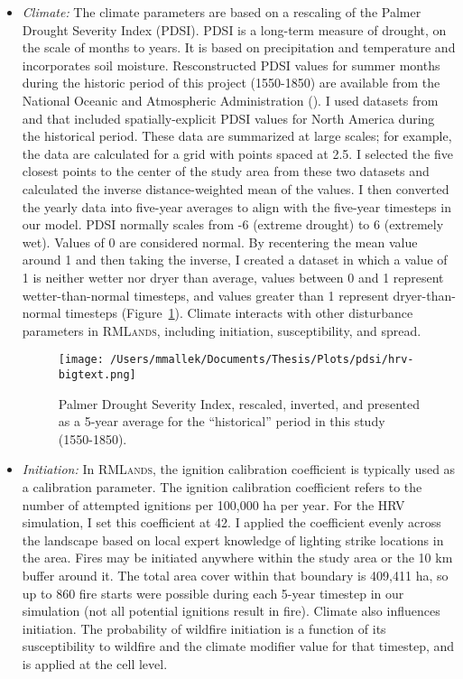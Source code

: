 \begin{itemize}
\item \emph{Climate:} The climate parameters are based on a rescaling of the Palmer Drought Severity Index (PDSI). PDSI is a long-term measure of drought, on the scale of months to years. It is based on precipitation and temperature and incorporates soil moisture. Resconstructed PDSI values for summer months during the historic period of this project (1550-1850) are available from the National Oceanic and Atmospheric Administration (). I used datasets from \citet{Zhangetal.2004} and \citet{Cook2004} that included spatially-explicit PDSI values for North America during the historical period. These data are summarized at large scales; for example, the \citet{Cook2004} data are calculated for a grid with points spaced at 2.5\textdegree. I selected the five closest points to the center of the study area from these two datasets and calculated the inverse distance-weighted mean of the values. I then converted the yearly data into five-year averages to align with the five-year timesteps in our model. PDSI normally scales from -6 (extreme drought) to 6 (extremely wet). Values of 0 are considered normal. By recentering the mean value around 1 and then taking the inverse, I created a dataset in which a value of 1 is neither wetter nor dryer than average, values between 0 and 1 represent wetter-than-normal timesteps, and values greater than 1 represent dryer-than-normal timesteps (Figure~\ref{pdsi}). Climate interacts with other disturbance parameters in \textsc{RMLands}, including initiation, susceptibility, and spread.

\begin{figure}[htbp]
\centering
\texttt{[image: /Users/mmallek/Documents/Thesis/Plots/pdsi/hrv-bigtext.png]}
\caption{Palmer Drought Severity Index, rescaled, inverted, and presented as a 5-year average for the ``historical'' period in this study (1550-1850).} 
\label{pdsi}
\end{figure}


\item \emph{Initiation:} In \textsc{RMLands}, the ignition calibration coefficient is typically used as a calibration parameter. The ignition calibration coefficient refers to the number of attempted ignitions per 100,000 ha per year. For the HRV simulation, I set this coefficient at 42. I applied the coefficient evenly across the landscape based on local expert knowledge of lighting strike locations in the area. Fires may be initiated anywhere within the study area or the 10 km buffer around it. The total area cover within that boundary is 409,411 ha, so up to 860 fire starts were possible during each 5-year timestep in our simulation (not all potential ignitions result in fire). Climate also influences initiation. The probability of wildfire initiation is a function of its susceptibility to wildfire and the climate modifier value for that timestep, and is applied at the cell level.


\end{itemize}
